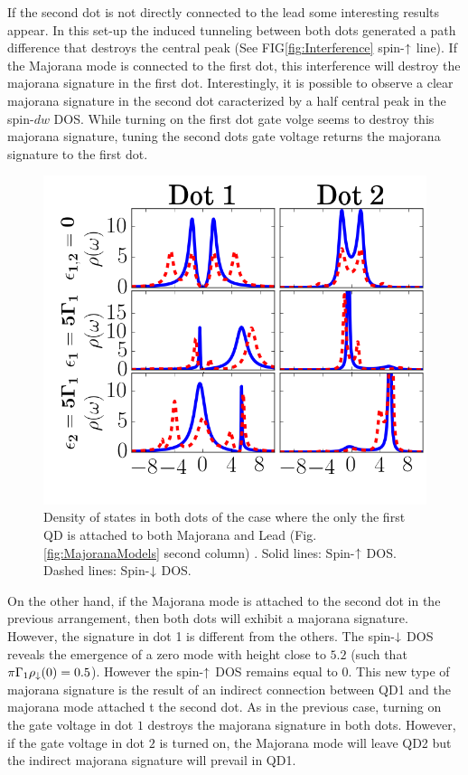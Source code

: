 \documentclass[showpacs,aps,prb,reprint,superscriptaddress]{revtex4-1}
\begin{document}
    If the second dot is not directly connected to the lead some interesting results appear. In this set-up the induced tunneling between both dots generated a path difference that destroys the central peak (See FIG\ref{fig:Interference} spin-$\uparrow$ line). If the Majorana mode is connected to the first dot, this interference will destroy the majorana signature in the first dot. Interestingly, it is possible to observe a clear majorana signature in the second dot caracterized by a half central peak in the spin-$dw$ DOS. While turning on the first dot gate volge seems to destroy this majorana signature, tuning the second dots gate voltage returns the majorana signature to the first dot. 
    

\begin{figure}[bt]
\begin{center}
\includegraphics[scale=0.48]{Graficos/t2=0.png}
\caption{  \label{fig:Interference} Density of states in both dots of the case where the only the first QD is attached to both Majorana and Lead (Fig.\ref{fig:MajoranaModels} second column) . Solid lines: Spin-$\uparrow$ DOS. Dashed lines: Spin-$\downarrow$ DOS.
}
%
\label{fig:GenModel}
\end{center}
\end{figure}


    On the other hand, if the Majorana mode is attached to the second dot in the previous arrangement, then both dots will exhibit a majorana signature. However, the signature in dot 1 is different from the others. The spin-$\downarrow$ DOS reveals the emergence of a zero mode with height close to $5.2$ (such that $\pi  \Gamma_1 \rho_\downarrow(0) = 0.5$). However the spin-$\uparrow$ DOS remains equal to $0$. This new type of majorana signature is the result of an indirect connection between QD1 and the majorana mode attached t the second dot. As in the previous case, turning on the gate voltage in dot $1$ destroys the majorana signature in both dots. However, if the gate voltage in dot $2$ is turned on, the Majorana mode will leave QD2 but the indirect majorana signature will prevail in QD1. 
    
\end{document}
